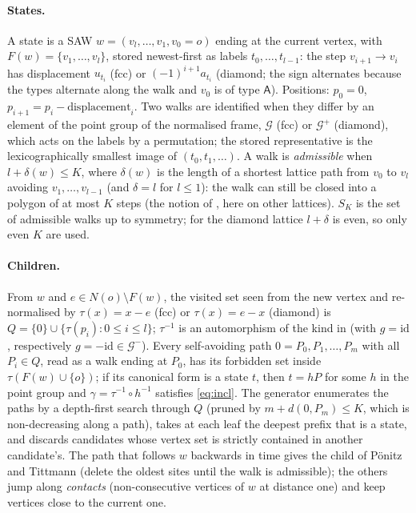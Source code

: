 \documentclass[11pt,a4paper]{report}
\begin{document}
\paragraph{States.} A state is a SAW \(w=(v_l,\dots,v_1,v_0=o)\) ending at the current vertex, with
\(F(w)=\{v_1,\dots,v_l\}\), stored newest-first as labels \(t_0,\dots,t_{l-1}\): the step \(v_{i+1}\to v_i\) has
displacement \(u_{t_i}\) (fcc) or \((-1)^{i+1}a_{t_i}\) (diamond; the sign alternates because the types alternate along
the walk and \(v_0\) is of type \(\mathsf A\)). Positions: \(p_0=0\), \(p_{i+1}=p_i-\text{displacement}_i\). Two walks
are identified when they differ by an element of the point group of the normalised frame, \(\mathcal G\) (fcc) or
\(\mathcal G^+\) (diamond), which acts on the labels by a permutation; the stored representative is the
lexicographically smallest image of \((t_0,t_1,\dots)\). A walk is \emph{admissible} when \(l+\delta(w)\le K\), where
\(\delta(w)\) is the length of a shortest lattice path from \(v_0\) to \(v_l\) avoiding \(v_1,\dots,v_{l-1}\) (and
\(\delta=l\) for \(l\le1\)): the walk can still be closed into a polygon of at most \(K\) steps (the notion of
\textcite{PonitzTittmann2000}, here on other lattices). \(S_K\) is the set of admissible walks up to symmetry; for the
diamond lattice \(l+\delta\) is even, so only even \(K\) are used.

\paragraph{Children.} From \(w\) and \(e\in N(o)\setminus F(w)\), the visited set seen from the new vertex and
re-normalised by \(\tau(x)=x-e\) (fcc) or \(\tau(x)=e-x\) (diamond) is \(Q=\{0\}\cup\{\tau(p_i):0\le i\le l\}\); \(\tau^{-1}\) is
an automorphism of the kind in  (with \(g=\mathrm{id}\), respectively \(g=-\mathrm{id}\in\mathcal G^-\)).
Every self-avoiding path \(0=P_0,P_1,\dots,P_m\) with all \(P_i\in Q\), read as a walk ending at \(P_0\), has its
forbidden set inside \(\tau(F(w)\cup\{o\})\); if its canonical form is a state \(t\), then \(t=hP\) for some \(h\) in the
point group and \(\gamma=\tau^{-1}\circ h^{-1}\) satisfies \eqref{eq:incl}. The generator enumerates the paths by a
depth-first search through \(Q\) (pruned by \(m+d(0,P_m)\le K\), which is non-decreasing along a path), takes at
each leaf the deepest prefix that is a state, and discards candidates whose vertex set is strictly contained in
another candidate's. The path that follows \(w\) backwards in time gives the child of Pönitz and Tittmann (delete the
oldest sites until the walk is admissible); the others jump along \emph{contacts} (non-consecutive vertices of \(w\)
at distance one) and keep vertices close to the current one.
\end{document}
